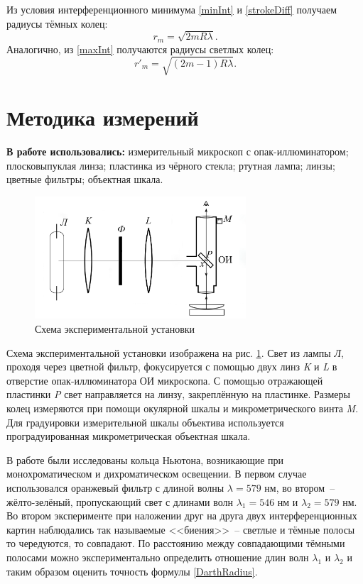 \documentclass[a4paper,12pt]{article} %
\begin{document}
Из условия интерференционного минимума \eqref{minInt} и \eqref{strokeDiff} получаем радиусы тёмных колец:
\begin{equation}\label{DarthRadius}
    r_m = \sqrt{2mR\lambda}.
\end{equation}
Аналогично, из \eqref{maxInt} получаются радиусы светлых колец:
\begin{equation}
    r'_m = \sqrt{(2m-1)R\lambda}.
\end{equation}

\section{Методика измерений}

\textbf{В работе использовались:} измерительный микроскоп с опак-иллюминатором; плосковыпуклая линза; пластинка из чёрного стекла; ртутная лампа; линзы; цветные фильтры; объектная шкала.
\begin{figure}[h]
    \centering
    \includegraphics[width=0.7\textwidth]{setup.png}
    \caption{Схема экспериментальной установки}
    \label{setup}
\end{figure}

Схема экспериментальной установки изображена на рис. \ref{setup}. Свет из лампы \textit{Л}, проходя через цветной фильтр, фокусируется с помощью двух линз \textit{K} и \textit{L} в отверстие опак-иллюминатора ОИ микроскопа. С помощью отражающей пластинки \textit{P} свет направляется на линзу, закреплённую на пластинке. Размеры колец измеряются при помощи окулярной шкалы и микрометрического винта \textit{M}. Для градуировки измерительной шкалы объектива используется проградуированная микрометрическая объектная шкала.

В работе были исследованы кольца Ньютона, возникающие при монохроматическом и дихроматическом освещении. В первом случае использовался оранжевый фильтр с длиной волны $\lambda = 579$ нм, во втором~-- жёлто-зелёный, пропускающий свет с длинами волн $\lambda_1 = 546$ нм и $\lambda_2 = 579$ нм. Во втором эксперименте при наложении друг на друга двух интерференционных картин наблюдались так называемые <<биения>>~-- светлые и тёмные полосы то чередуются, то совпадают. По расстоянию между совпадающими тёмными полосами можно экспериментально определить отношение длин волн $\lambda_1$ и $\lambda_2$ и таким образом оценить точность формулы \eqref{DarthRadius}. 
\end{document}

